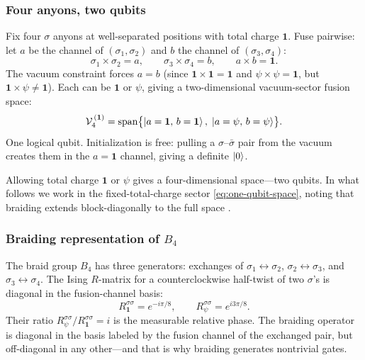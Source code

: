 \subsubsection*{Four anyons, two qubits}

Fix four $\sigma$ anyons at well-separated positions with total charge $\mathbf{1}$.  Fuse pairwise: let $a$ be the channel of $(\sigma_1, \sigma_2)$ and $b$ the channel of $(\sigma_3, \sigma_4)$:
\begin{equation}
  \sigma_1 \times \sigma_2 = a, \qquad
  \sigma_3 \times \sigma_4 = b, \qquad
  a \times b = \mathbf{1}.
  \label{eq:pairwise-fusion}
\end{equation}
The vacuum constraint forces $a = b$ (since $\mathbf{1}\times\mathbf{1}=\mathbf{1}$ and $\psi\times\psi=\mathbf{1}$, but $\mathbf{1}\times\psi\neq\mathbf{1}$).  Each can be $\mathbf{1}$ or $\psi$, giving a two-dimensional vacuum-sector fusion space:
\begin{equation}
  \mathcal{V}_4^{\,(\mathbf{1})} = \mathrm{span}\bigl\{
    \left|a = \mathbf{1},\, b = \mathbf{1}\right\rangle,\;
    \left|a = \psi,\, b = \psi\right\rangle
  \bigr\}.
  \label{eq:one-qubit-space}
\end{equation}
One logical qubit.  Initialization is free: pulling a $\sigma$--$\bar\sigma$ pair from the vacuum creates them in the $a=\mathbf{1}$ channel, giving a definite $\left|0\right\rangle$.

Allowing total charge $\mathbf{1}$ or $\psi$ gives a four-dimensional space---two qubits.  In what follows we work in the fixed-total-charge sector \eqref{eq:one-qubit-space}, noting that braiding extends block-diagonally to the full space \cite{NayakSimonSternFreedmanDasSarma2008NonabelianAnyons}.

\subsubsection*{Braiding representation of $B_4$}

The braid group $B_4$ has three generators: exchanges of $\sigma_1\leftrightarrow\sigma_2$, $\sigma_2\leftrightarrow\sigma_3$, and $\sigma_3\leftrightarrow\sigma_4$.  The Ising $R$-matrix for a counterclockwise half-twist of two $\sigma$'s is diagonal in the fusion-channel basis:
\begin{equation}
  R^{\sigma\sigma}_{\mathbf{1}} = e^{-i\pi/8}, \qquad
  R^{\sigma\sigma}_{\psi} = e^{i 3\pi/8}.
  \label{eq:ising-R-matrix}
\end{equation}
Their ratio $R^{\sigma\sigma}_\psi / R^{\sigma\sigma}_{\mathbf{1}} = i$ is the measurable relative phase.  The braiding operator is diagonal in the basis labeled by the fusion channel of the exchanged pair, but off-diagonal in any other---and that is why braiding generates nontrivial gates.

